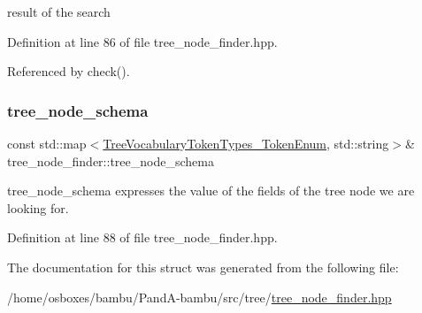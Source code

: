 result of the search 



Definition at line 86 of file tree\+\_\+node\+\_\+finder.\+hpp.



Referenced by check().

\mbox{\label{structtree__node__finder_af926baf8d6d39b33dcbdf5167454411a}} 
\subsubsection{\texorpdfstring{tree\+\_\+node\+\_\+schema}{tree\_node\_schema}}
{\footnotesize\ttfamily const std\+::map$<$\hyperlink{token__interface_8hpp_a14502d0757789149f644966ca931b126}{Tree\+Vocabulary\+Token\+Types\+\_\+\+Token\+Enum}, std\+::string$>$\& tree\+\_\+node\+\_\+finder\+::tree\+\_\+node\+\_\+schema\hspace{0.3cm}{\ttfamily [private]}}



tree\+\_\+node\+\_\+schema expresses the value of the fields of the tree node we are looking for. 



Definition at line 88 of file tree\+\_\+node\+\_\+finder.\+hpp.



The documentation for this struct was generated from the following file\+:\begin{DoxyCompactItemize}
\item 
/home/osboxes/bambu/\+Pand\+A-\/bambu/src/tree/\hyperlink{tree__node__finder_8hpp}{tree\+\_\+node\+\_\+finder.\+hpp}\end{DoxyCompactItemize}

